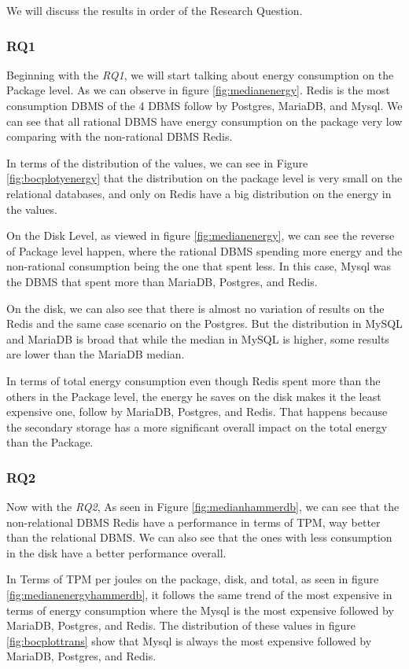 
		We will discuss the results in order of the Research Question.
	    \subsubsection{RQ1}

	Beginning with the \textit{RQ1}, we will start talking about energy consumption on the Package level. As we can observe in figure \ref{fig:medianenergy}. Redis is the most consumption DBMS of the 4 DBMS follow by Postgres, MariaDB, and Mysql. We can see that all rational DBMS have energy consumption on the package very low comparing with the non-rational DBMS Redis.
	
	In terms of the distribution of the values, we can see in Figure \ref{fig:bocplotyenergy} that the distribution on the package level is very small on the relational databases, and only on Redis have a big distribution on the energy in the values. 
	
	On the Disk Level, as viewed in figure \ref{fig:medianenergy}, we can see the reverse of Package level happen, where the rational DBMS spending more energy and the non-rational consumption being the one that spent less. In this case, Mysql was the DBMS that spent more than MariaDB, Postgres, and Redis.
	
	On the disk, we can also see that there is almost no variation of results on the Redis and the same case scenario on the Postgres. But the distribution in MySQL and MariaDB is broad that while the median in MySQL is higher, some results are lower than the MariaDB median.
	
	In terms of total energy consumption even though Redis spent more than the others in the Package level, the energy he saves on the disk makes it the least expensive one, follow by MariaDB, Postgres, and Redis.  That happens because the secondary storage has a more significant overall impact on the total energy than the Package.
	
    \subsubsection{RQ2}

	
	Now with the \textit{RQ2}, As seen in Figure \ref{fig:medianhammerdb}, we can see that the non-relational DBMS Redis have a performance in terms of TPM, way better than the relational DBMS. We can also see that the ones with less consumption in the disk have a better performance overall. 
	
	In Terms of TPM per joules on the package, disk, and total, as seen in figure \ref{fig:medianenergyhammerdb}, it follows the same trend of the most expensive in terms of energy consumption where the Mysql is the most expensive followed by MariaDB, Postgres, and Redis. The distribution of these values in figure \ref{fig:bocplottrans} show that Mysql is always the most expensive followed by MariaDB, Postgres, and Redis.
	
